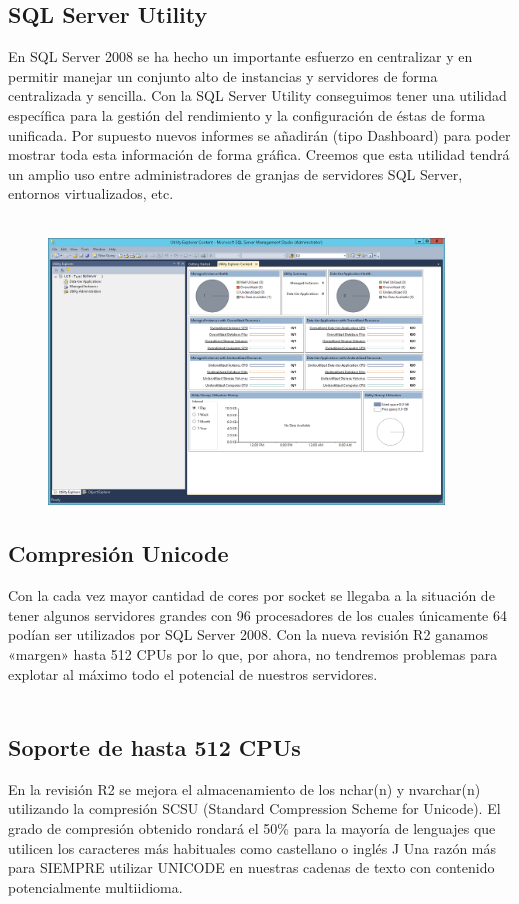 \documentclass[preprint,12pt]{elsarticle}
\begin{document}
\subsection{SQL Server Utility}
En SQL Server 2008 se ha hecho un importante esfuerzo en centralizar y en permitir manejar un conjunto alto de instancias y servidores de forma centralizada y sencilla. Con la SQL Server Utility conseguimos tener una utilidad específica para la gestión del rendimiento y la configuración de éstas de forma unificada. Por supuesto nuevos informes se añadirán (tipo Dashboard) para poder mostrar toda esta información de forma gráfica. Creemos que esta utilidad tendrá un amplio uso entre administradores de granjas de servidores SQL Server, entornos virtualizados, etc.
\\
\\

\begin{figure}[htb]
				\begin{center}
					\includegraphics[width=10.5cm]{./IMAGENES/SQLServeUtility}
				\end{center}
			\end{figure}


\subsection{Compresión Unicode}
Con la cada vez mayor cantidad de cores por socket se llegaba a la situación de tener algunos servidores grandes con 96 procesadores de los cuales únicamente 64 podían ser utilizados por SQL Server 2008. Con la nueva revisión R2 ganamos «margen» hasta 512 CPUs por lo que, por ahora, no tendremos problemas para explotar al máximo todo el potencial de nuestros servidores.
\\
\\
\subsection{Soporte de hasta 512 CPUs}
En la revisión R2 se mejora el almacenamiento de los nchar(n) y nvarchar(n) utilizando la compresión SCSU (Standard Compression Scheme for Unicode). El grado de compresión obtenido rondará el 50\% para la mayoría de lenguajes que utilicen los caracteres más habituales como castellano o inglés J Una razón más para SIEMPRE utilizar UNICODE en nuestras cadenas de texto con contenido potencialmente multiidioma.
\end{document}
